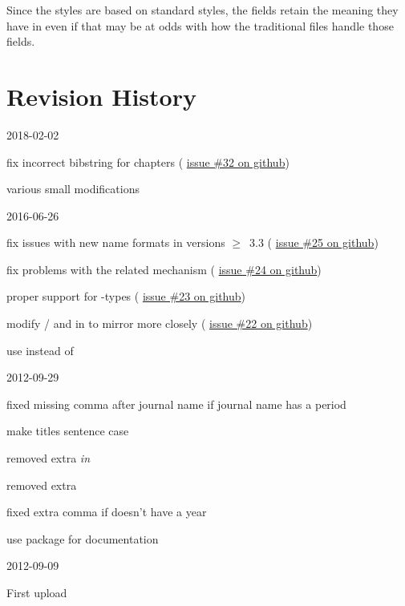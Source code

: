 \documentclass{ltxdockit}[2011/03/25]
\newcommand*{\gitissuelink}[1]{%
  \href{https://github.com/moewew/biblatex-trad/issues/#1}{issue \##1 on github}}
\begin{document}
Since the styles are based on  standard styles, the fields retain the meaning
they have in  even if that may be at odds with how the traditional 
files handle those fields.


\section{Revision History}\label{apx:log}
\begin{changelog}
\begin{release}{0.4}{2018-02-02}
\item fix incorrect bibstring for chapters (\gitissuelink{32})
\item various small modifications
\end{release}

\begin{release}{0.3}{2016-06-26}
\item fix issues with new name formats in  versions $\geq$~3.3 (\gitissuelink{25})
\item fix problems with the related mechanism (\gitissuelink{24})
\item proper support for -types (\gitissuelink{23})
\item modify / and  in  to mirror  more closely (\gitissuelink{22})
\item use  instead of 
\end{release}

\begin{release}{0.2}{2012-09-29}
\item fixed missing comma after journal name if journal name has a period
\item make titles sentence case
\item removed extra \emph{in}
\item removed extra 
\item fixed extra comma if  doesn't have a year
\item use package  for documentation
\end{release}

\begin{release}{0.1}{2012-09-09}
\item First upload
\end{release}
\end{changelog}
\end{document}
